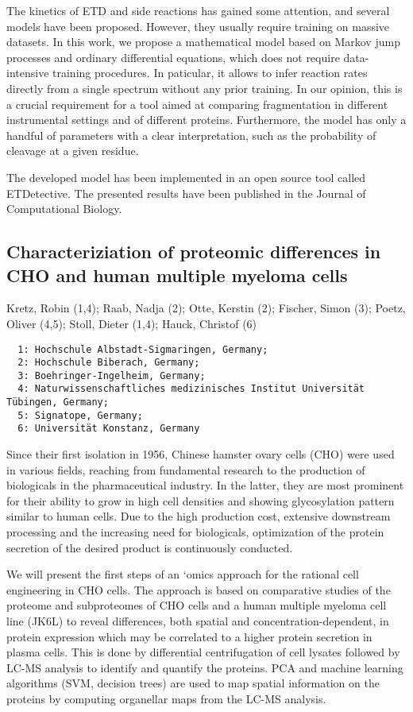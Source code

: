 {The kinetics of ETD and side reactions has gained some attention, and several models have been proposed. However, they usually require training on massive datasets. In this work, we propose a mathematical model based on Markov jump processes and ordinary differential equations, which does not require data-intensive training procedures. In paticular, it allows to infer reaction rates directly from a single spectrum without any prior training. In our opinion, this is a crucial requirement for a tool aimed at comparing fragmentation in different instrumental settings and of different proteins. Furthermore, the model has only a handful of parameters with a clear interpretation, such as the probability of cleavage at a given residue.

The developed model has been implemented in an open source tool called ETDetective. The presented results have been published in the Journal of Computational Biology.
 

\subsection*{\color{eubicRed} Characteriziation of proteomic differences in CHO and human multiple myeloma cells}
{\color{eubicGray}Kretz, Robin (1,4);
Raab, Nadja (2);
Otte, Kerstin (2);
Fischer, Simon (3);
Poetz, Oliver (4,5);
Stoll, Dieter (1,4);
Hauck, Christof (6)}
{\color{eubicGray}\begin{verbatim}
  1: Hochschule Albstadt-Sigmaringen, Germany;
  2: Hochschule Biberach, Germany;
  3: Boehringer-Ingelheim, Germany;
  4: Naturwissenschaftliches medizinisches Institut Universität Tübingen, Germany;
  5: Signatope, Germany;
  6: Universität Konstanz, Germany
\end{verbatim}}

Since their first isolation in 1956, Chinese hamster ovary cells (CHO) were used in various fields, reaching from fundamental research to the production of biologicals in the pharmaceutical industry. In the latter, they are most prominent for their ability to grow in high cell densities and showing glycosylation pattern similar to human cells. Due to the high production cost, extensive downstream processing and the increasing need for biologicals, optimization of the protein secretion of the desired product is continuously conducted.

We will present the first steps of an ‘omics approach for the rational cell engineering in CHO cells. The approach is based on comparative studies of the proteome and subproteomes of CHO cells and a human multiple myeloma cell line (JK6L) to reveal differences, both spatial and concentration-dependent, in protein expression which may be correlated to a higher protein secretion in plasma cells. This is done by differential centrifugation of cell lysates followed by LC-MS analysis to identify and quantify the proteins. PCA and machine learning algorithms (SVM, decision trees) are used to map spatial information on the proteins by computing organellar maps from the LC-MS analysis.


}
